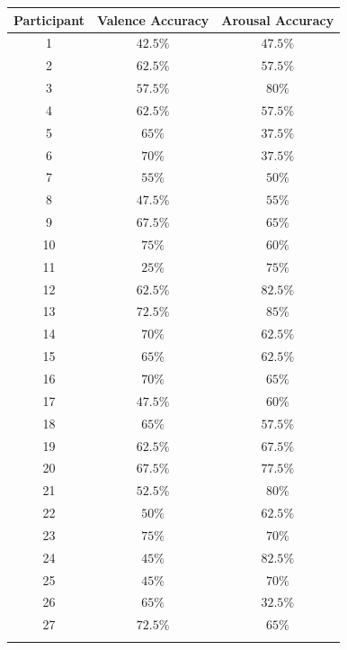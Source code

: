 \documentclass[10pt,journal,A4paper,compsoc,epsfig]{IEEEtran}
\begin{document}
\begin{table}
\centering
\begin{tabular}{c c c}
Participant & Valence Accuracy & Arousal Accuracy \\ 
\hline 
\noalign{\medskip}
1 & $42.5\%$ & $47.5\%$ \\ \noalign{\smallskip}
2 & $62.5\%$ & $57.5\%$ \\ \noalign{\smallskip}
3 & $57.5\%$ & $80\%$ \\ \noalign{\smallskip}
4 & $62.5\%$ & $57.5\%$ \\ \noalign{\smallskip}
5 & $65\%$ & $37.5\%$ \\ \noalign{\smallskip}
6 & $70\%$ & $37.5\%$ \\ \noalign{\smallskip}
7 & $55\%$ & $50\%$ \\ \noalign{\smallskip}
8 & $47.5\%$ & $55\%$ \\ \noalign{\smallskip}
9 & $67.5\%$ & $65\%$ \\ \noalign{\smallskip}
10 & $75\%$ & $60\%$ \\ \noalign{\smallskip}
11 & $25\%$ & $75\%$ \\ \noalign{\smallskip}
12 & $62.5\%$ & $82.5\%$ \\ \noalign{\smallskip}
13 & $72.5\%$ & $85\%$ \\ \noalign{\smallskip}
14 & $70\%$ & $62.5\%$ \\ \noalign{\smallskip}
15 & $65\%$ & $62.5\%$ \\ \noalign{\smallskip}
16 & $70\%$ & $65\%$ \\ \noalign{\smallskip}
17 & $47.5\%$ & $60\%$ \\ \noalign{\smallskip}
18 & $65\%$ & $57.5\%$ \\ \noalign{\smallskip}
19 & $62.5\%$ & $67.5\%$ \\ \noalign{\smallskip}
20 & $67.5\%$ & $77.5\%$ \\ \noalign{\smallskip}
21 & $52.5\%$ & $80\%$ \\ \noalign{\smallskip}
22 & $50\%$ & $62.5\%$ \\ \noalign{\smallskip}
23 & $75\%$ & $70\%$ \\ \noalign{\smallskip}
24 & $45\%$ & $82.5\%$ \\ \noalign{\smallskip}
25 & $45\%$ & $70\%$ \\ \noalign{\smallskip}
26 & $65\%$ & $32.5\%$ \\ \noalign{\smallskip}
27 & $72.5\%$ & $65\%$ \\ \noalign{\smallskip}

\end{tabular}
\end{table}
\end{document}
